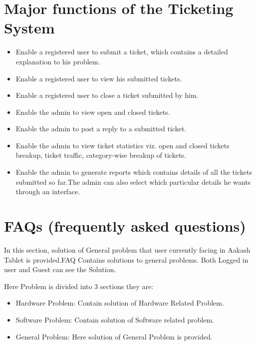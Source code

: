 \documentclass[letterpaper,10pt,english]{sphinxmanual}
\begin{document}
\section{Major functions of the Ticketing System}
\label{functionalreq:major-functions-of-the-ticketing-system}\begin{itemize}
\item {} 
Enable a registered user to submit a ticket, which contains a detailed explanation to his problem.

\item {} 
Enable a registered user to view his submitted tickets.

\item {} 
Enable a registered user to close a ticket submitted by him.

\item {} 
Enable the admin to view open and closed tickets.

\item {} 
Enable the admin to post a reply to a submitted ticket.

\item {} 
Enable the admin to view ticket statistics viz. open and closed tickets breakup, ticket traffic, category-wise breakup of tickets.

\item {} 
Enable the admin to generate reports which contains details of all the tickets submitted so far.The admin can also select which particular details he wants through an interface.

\end{itemize}


\section{FAQs (frequently asked questions)}
\label{functionalreq:faqs-frequently-asked-questions}
In this section, solution of General problem that user currently facing in Aakash Tablet is provided.FAQ Contains solutions to general problems.
Both Logged in user and Guest can see the Solution.

Here Problem is divided into 3 sections they are:
\begin{itemize}
\item {} 
Hardware Problem: Contain solution of Hardware Related Problem.

\item {} 
Software Problem: Contain solution of Software related problem.

\item {} 
General Problem:   Here solution of General Problem is provided.

\end{itemize}
\end{document}
